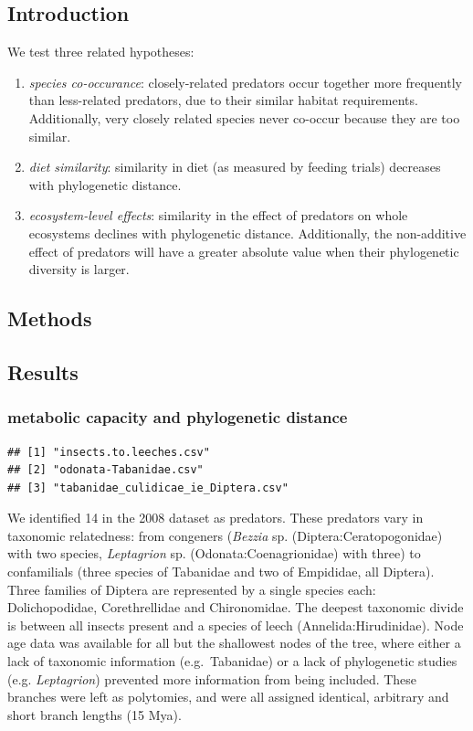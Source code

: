 \subsection{Introduction}

We test three related hypotheses:

\begin{enumerate}
\def\labelenumi{\arabic{enumi}.}
\item
  \emph{species co-occurance}: closely-related predators occur together
  more frequently than less-related predators, due to their similar
  habitat requirements. Additionally, very closely related species never
  co-occur because they are too similar.
\item
  \emph{diet similarity}: similarity in diet (as measured by feeding
  trials) decreases with phylogenetic distance.
\item
  \emph{ecosystem-level effects}: similarity in the effect of predators
  on whole ecosystems declines with phylogenetic distance. Additionally,
  the non-additive effect of predators will have a greater absolute
  value when their phylogenetic diversity is larger.
\end{enumerate}

\subsection{Methods}

\subsection{Results}

\subsubsection{metabolic capacity and phylogenetic distance}

\begin{verbatim}
## [1] "insects.to.leeches.csv"            
## [2] "odonata-Tabanidae.csv"             
## [3] "tabanidae_culidicae_ie_Diptera.csv"
\end{verbatim}

We identified 14 in the 2008 dataset as predators. These predators vary
in taxonomic relatedness: from congeners (\emph{Bezzia} sp.
(Diptera:Ceratopogonidae) with two species, \emph{Leptagrion} sp.
(Odonata:Coenagrionidae) with three) to confamilials (three species of
Tabanidae and two of Empididae, all Diptera). Three families of Diptera
are represented by a single species each: Dolichopodidae, Corethrellidae
and Chironomidae. The deepest taxonomic divide is between all insects
present and a species of leech (Annelida:Hirudinidae). Node age data was
available for all but the shallowest nodes of the tree, where either a
lack of taxonomic information (e.g.~Tabanidae) or a lack of phylogenetic
studies (e.g. \emph{Leptagrion}) prevented more information from being
included. These branches were left as polytomies, and were all assigned
identical, arbitrary and short branch lengths (15 Mya).

